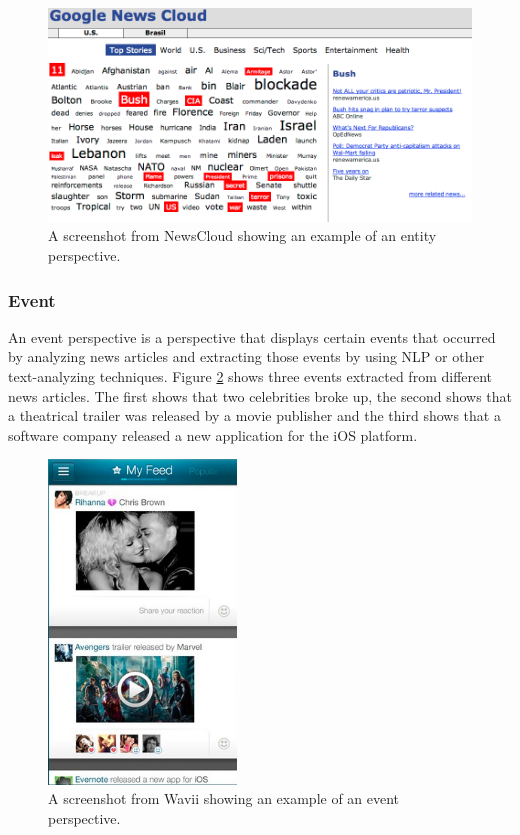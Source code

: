 \begin{figure}[!htbp]
\centering
\includegraphics[width=140mm]{GFX/perspectives/entityViewNewsCloud.png}
\caption{A screenshot from NewsCloud showing an example of an entity perspective.}
\label{entity_news_cloud}
\end{figure}

\subsubsection{Event}
An event perspective is a perspective that displays certain events that occurred by analyzing news articles and extracting those events by using NLP or other text-analyzing techniques. Figure \ref{event_wavii} shows three events extracted from different news articles. The first shows that two celebrities broke up, the second shows that a theatrical trailer was released by a movie publisher and the third shows that a software company released a new application for the iOS platform.

\begin{figure}[!htbp]
\centering
\includegraphics[width=50mm]{GFX/perspectives/eventViewWavii.png}
\caption{A screenshot from Wavii showing an example of an event perspective.}
\label{event_wavii}
\end{figure}


